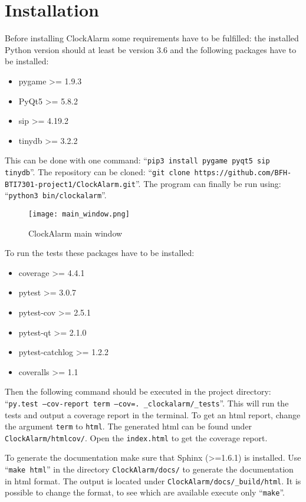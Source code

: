 \chapter{Installation}\label{ch:installation}

Before installing ClockAlarm some requirements have to be fulfilled: the
installed Python version should at least be version 3.6 and the following
packages have to be installed:

\begin{itemize}
    \item pygame >= 1.9.3
    \item PyQt5 >= 5.8.2 
    \item sip >= 4.19.2
    \item tinydb >= 3.2.2 
\end{itemize}

This can be done with one command: ``\texttt{pip3 install pygame pyqt5 sip
tinydb}''.
The repository can be cloned: ``\texttt{git clone
https://github.com/BFH-BTI7301-project1/ClockAlarm.git}''.
The program can finally be run using: ``\texttt{python3 bin/clockalarm}''.

\begin{figure}[h]
    \centering
    \caption{ClockAlarm main window}
    \texttt{[image: main\_window.png]}
\end{figure}

To run the tests these packages have to be installed:

\begin{itemize}
    \item coverage >= 4.4.1
    \item pytest >= 3.0.7
    \item pytest-cov >= 2.5.1
    \item pytest-qt >= 2.1.0
    \item pytest-catchlog >= 1.2.2
    \item coveralls >= 1.1
\end{itemize}

Then the following command should be executed in the project directory:
``\texttt{py.test --cov-report term --cov=. \_clockalarm/\_tests}''. This will
run the tests and output a coverage report in the terminal. To get an html
report, change the argument \texttt{term} to \texttt{html}. The generated html
can be found under \texttt{ClockAlarm/htmlcov/}. Open the \texttt{index.html} to
get the coverage report.

To generate the documentation make sure that Sphinx (>=1.6.1) is installed. Use
``\texttt{make html}'' in the directory \texttt{ClockAlarm/docs/} to generate the
documentation in html format. The output is located under
\texttt{ClockAlarm/docs/\_build/html}. It is possible to change the format, to
see which are available execute only ``\texttt{make}''.
